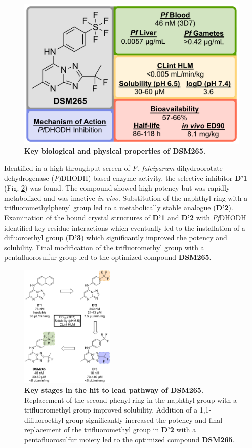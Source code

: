 \documentclass[twocolumn]{bmcart}%
\begin{document}
\begin{figure}[h]
	\includegraphics [scale=0.575] {Figure30}
	\caption{\bf Key biological and physical properties of DSM265.}
	\label{Figure30}
\end{figure}

Identified in a high-throughput screen of \textit{P. falciparum} dihydroorotate dehydrogenase (\textit{Pf}DHODH)-based enzyme activity, the selective inhibitor \textbf{D'1} (Fig. \ref{Figure31}) was found. The compound showed high potency but was rapidly metabolized and was inactive \textit{in vivo}. Substitution of the naphthyl ring with a trifluoromethylphenyl group led to a metabolically stable analogue (\textbf{D'2}). Examination of the bound crystal structures of \textbf{D'1} and \textbf{D'2} with \textit{Pf}DHODH identified key residue interactions which eventually led to the installation of a difluoroethyl group (\textbf{D'3}) which significantly improved the potency and solubility. Final modification of the trifluoromethyl group with a pentafluorosulfur group led to the optimized compound \textbf{DSM265}.

\begin{figure}[h]
	\includegraphics [width=0.4\textwidth] {Figure31}
	\caption{{\bf Key stages in the hit to lead pathway of DSM265.} Replacement of the second phenyl ring in the naphthyl group with a trifluoromethyl group improved solubility. Addition of a 1,1-difluoroethyl group significantly increased the potency and final replacement of the trifluoromethyl group in \textbf{D'2} with a pentafluorosulfur moiety led to the optimized compound \textbf{DSM265}.}
	\label{Figure31}
\end{figure}
\end{document}
